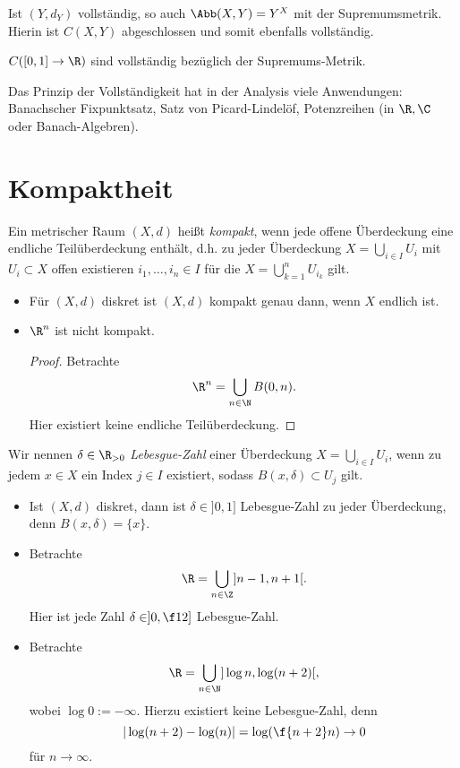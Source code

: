 \begin{st}
	Ist $(Y,d_Y)$ vollständig, so auch $\Abb(X,Y) = Y^X$ mit der Supremumsmetrik.
	Hierin ist $C(X,Y)$ abgeschlossen und somit ebenfalls vollständig.
\end{st}

\begin{ex}
	$C([0,1] \to \R)$ sind vollständig bezüglich der Supremums-Metrik.
\end{ex}

Das Prinzip der Vollständigkeit hat in der Analysis viele Anwendungen: Banachscher Fixpunktsatz, Satz von Picard-Lindelöf, Potenzreihen (in $\R, \C$ oder Banach-Algebren).


\section{Kompaktheit}


\begin{df} \label{df:compact_space}
	Ein metrischer Raum $(X,d)$ heißt \emph{kompakt}, wenn jede offene Überdeckung eine endliche Teilüberdeckung enthält, d.h. zu jeder Überdeckung $X = \bigcup_{i \in I} U_i$ mit $U_i \subset X$ offen existieren $i_1, \dotsc, i_n \in I$ für die $X = \bigcup_{k=1}^n U_{i_k}$ gilt.
\end{df}

\begin{ex}
	\begin{itemize}
		\item
			Für $(X,d)$ diskret ist $(X,d)$ kompakt genau dann, wenn $X$ endlich ist.
		\item
			$\R^n$ ist nicht kompakt.
			\begin{proof}
				Betrachte
				\[
					\R^n = \bigcup_{n\in \N} B(0,n).
				\]
				Hier existiert keine endliche Teilüberdeckung.
			\end{proof}
	\end{itemize}
\end{ex}

\begin{df}
	Wir nennen $\delta \in \R_{>0}$ \emph{Lebesgue-Zahl} einer Überdeckung $X = \bigcup_{i\in I} U_i$,  wenn zu jedem $x \in X$ ein Index $j\in I$ existiert, sodass $B(x,\delta) \subset U_j$ gilt.
\end{df}

\begin{ex}
	\begin{itemize}
		\item
			Ist $(X,d)$ diskret, dann ist $\delta \in ]0,1]$ Lebesgue-Zahl zu jeder Überdeckung, denn $B(x,\delta) = \{x\}$.
		\item
			Betrachte
			\[
				\R = \bigcup_{n \in \Z} ]n-1, n+1[.
			\]
			Hier ist jede Zahl $\delta \in ]0,\f 12]$ Lebesgue-Zahl.
		\item
			Betrachte
			\[
				\R = \bigcup_{n\in\N} ] \log n, \log(n+2) [,
			\]
			wobei $\log 0 := -\infty$.
			Hierzu existiert keine Lebesgue-Zahl, denn
			\[
				|\log (n+2) - \log(n)| = \log (\f {n+2}n) \to 0
			\]
			für $n \to \infty$.
	\end{itemize}
\end{ex}

